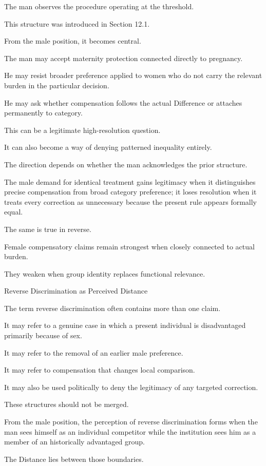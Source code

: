 The man observes the procedure operating at the threshold.

This structure was introduced in Section 12.1.

From the male position, it becomes central.

The man may accept maternity protection connected directly to pregnancy.

He may resist broader preference applied to women who do not carry the relevant burden in the particular decision.

He may ask whether compensation follows the actual Difference or attaches permanently to category.

This can be a legitimate high-resolution question.

It can also become a way of denying patterned inequality entirely.

The direction depends on whether the man acknowledges the prior structure.

The male demand for identical treatment gains legitimacy when it distinguishes precise compensation from broad category preference; it loses resolution when it treats every correction as unnecessary because the present rule appears formally equal.

The same is true in reverse.

Female compensatory claims remain strongest when closely connected to actual burden.

They weaken when group identity replaces functional relevance.

Reverse Discrimination as Perceived Distance

The term reverse discrimination often contains more than one claim.

It may refer to a genuine case in which a present individual is disadvantaged primarily because of sex.

It may refer to the removal of an earlier male preference.

It may refer to compensation that changes local comparison.

It may also be used politically to deny the legitimacy of any targeted correction.

These structures should not be merged.

From the male position, the perception of reverse discrimination forms when the man sees himself as an individual competitor while the institution sees him as a member of an historically advantaged group.

The Distance lies between those boundaries.

